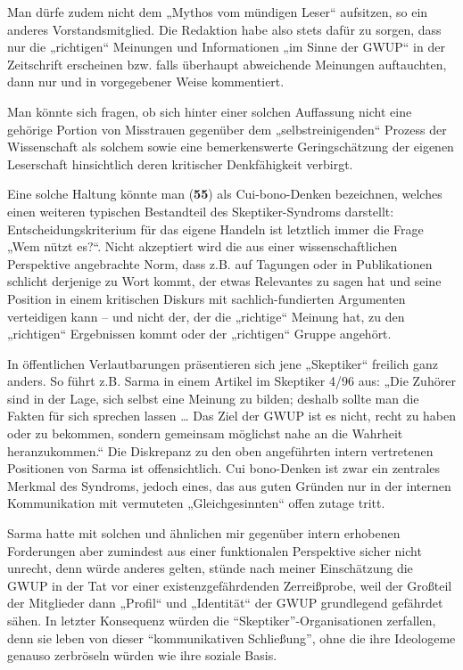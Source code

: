 Man dürfe zudem nicht dem „Mythos vom mündigen Leser`` aufsitzen, so ein
anderes Vorstandsmitglied. Die Redaktion habe also stets dafür zu
sorgen, dass nur die „richtigen`` Meinungen und Informationen „im Sinne
der GWUP`` in der Zeitschrift erscheinen bzw. falls überhaupt
abweichende Meinungen auftauchten, dann nur und in vorgegebener Weise
kommentiert.

Man könnte sich fragen, ob sich hinter einer solchen Auffassung nicht
eine gehörige Portion von Misstrauen gegenüber dem „selbstreinigenden``
Prozess der Wissenschaft als solchem sowie eine bemerkenswerte
Geringschätzung der eigenen Leserschaft hinsichtlich deren kritischer
Denkfähigkeit verbirgt.

Eine solche Haltung könnte man (\textbf{55}) als Cui-bono-Denken
bezeichnen, welches einen weiteren typischen Bestandteil des
Skeptiker-Syndroms darstellt: Entscheidungskriterium für das eigene
Handeln ist letztlich immer die Frage „Wem nützt es?``. Nicht akzeptiert
wird die aus einer wissenschaftlichen Perspektive angebrachte Norm, dass
z.B. auf Tagungen oder in Publikationen schlicht derjenige zu Wort
kommt, der etwas Relevantes zu sagen hat und seine Position in einem
kritischen Diskurs mit sachlich-fundierten Argumenten verteidigen kann
-- und nicht der, der die „richtige`` Meinung hat, zu den „richtigen``
Ergebnissen kommt oder der „richtigen`` Gruppe angehört.

In öffentlichen Verlautbarungen präsentieren sich jene „Skeptiker``
freilich ganz anders. So führt z.B. Sarma in einem Artikel im Skeptiker
4/96 aus: „Die Zuhörer sind in der Lage, sich selbst eine Meinung zu
bilden; deshalb sollte man die Fakten für sich sprechen lassen \ldots{}
Das Ziel der GWUP ist es nicht, recht zu haben oder zu bekommen, sondern
gemeinsam möglichst nahe an die Wahrheit heranzukommen.`` Die Diskrepanz
zu den oben angeführten intern vertretenen Positionen von Sarma ist
offensichtlich. Cui bono-Denken ist zwar ein zentrales Merkmal des
Syndroms, jedoch eines, das aus guten Gründen nur in der internen
Kommunikation mit vermuteten „Gleichgesinnten`` offen zutage tritt.

Sarma hatte mit solchen und ähnlichen mir gegenüber intern erhobenen
Forderungen aber zumindest aus einer funktionalen Perspektive sicher
nicht unrecht, denn würde anderes gelten, stünde nach meiner
Einschätzung die GWUP in der Tat vor einer existenzgefährdenden
Zerreißprobe, weil der Großteil der Mitglieder dann „Profil`` und
„Identität`` der GWUP grundlegend gefährdet sähen. In letzter Konsequenz
würden die ``Skeptiker''-Organisationen zerfallen, denn sie leben von
dieser ``kommunikativen Schließung'', ohne die ihre Ideologeme genauso
zerbröseln würden wie ihre soziale Basis.

